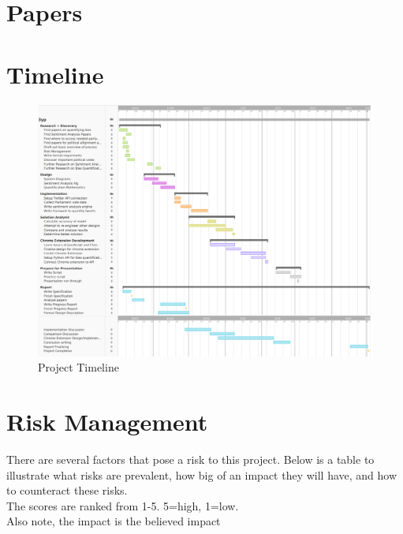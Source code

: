 \documentclass[a4paper,fleqn,12pt]{article}
\begin{document}
\section{Papers}

\newpage
\section{Timeline}
\begin{figure}[h]
    \includegraphics[width=150mm]{../images/3yp timeline.png}
    \caption{Project Timeline}
    \label{fig:timeline}
\end{figure}
\newpage
\section{Risk Management}
There are several factors that pose a risk to this project. Below is a table to illustrate what risks are prevalent, how big of an impact they will have, and how to counteract these risks.\\
The scores are ranked from 1-5. 5=high, 1=low.\\
Also note, the impact is the believed impact
\end{document}
